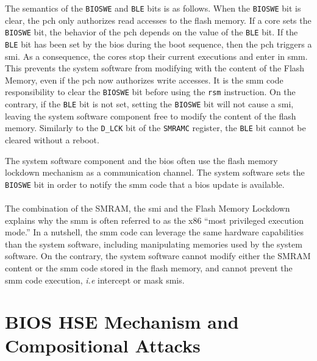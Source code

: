 The semantics of the \texttt{BIOSWE} and \texttt{BLE} bits is as follows.
%
When the \texttt{BIOSWE} bit is clear, the \ac{pch} only authorizes read
accesses to the flash memory.
%
If a core sets the \texttt{BIOSWE} bit, the behavior of the \ac{pch} depends on
the value of the \texttt{BLE} bit.
%
If the \texttt{BLE} bit has been set by the \ac{bios} during the boot sequence,
then the \ac{pch} triggers a \ac{smi}.
%
As a consequence, the cores stop their current
executions and enter in \ac{smm}.
%
This prevents the system software from modifying with the content of the Flash
Memory, even if the \ac{pch} now authorizes write accesses.
%
It is the \ac{smm} code responsibility to clear the \texttt{BIOSWE} bit before
using the \texttt{rsm} instruction.
%
On the contrary, if the \texttt{BLE} bit is not set, setting the \texttt{BIOSWE}
bit will not cause a \ac{smi}, leaving the system software component free to
modify the content of the flash memory.
%
Similarly to the \texttt{D\_LCK} bit of the \texttt{SMRAMC} register, the
\texttt{BLE} bit cannot be cleared without a reboot.

The system software component and the \ac{bios} often use the flash memory
lockdown mechanism as a communication channel.
%
The system software sets the \texttt{BIOSWE} bit in order to notify the \ac{smm}
code that a \ac{bios} update is available.

\paragraph{}
%
The combination of the SMRAM, the \ac{smi} and the Flash Memory Lockdown
explains why the \ac{smm} is often referred to as the x86 ``most privileged
execution mode.''
%
In a nutshell, the \ac{smm} code can leverage the same hardware capabilities
than the system software, including manipulating memories used by the system
software.
%
On the contrary, the system software cannot modify either the SMRAM content or
the \ac{smm} code stored in the flash memory, and cannot prevent the \ac{smm}
code execution, \emph{i.e} intercept or mask \acp{smi}.



\section{BIOS HSE Mechanism and Compositional Attacks}
\label{sec:usecase:hse}


